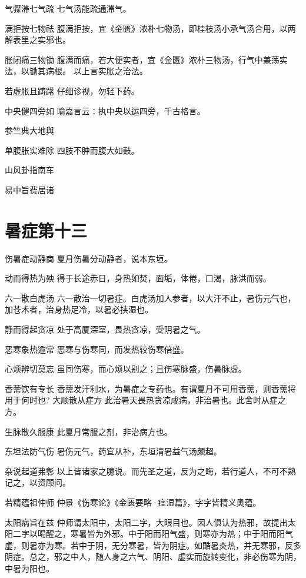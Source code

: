 \documentclass[a4paper,12pt,UTF8,twoside]{ctexbook}
\begin{document}
    气骤滞七气疏
    七气汤能疏通滞气。
    
    满拒按七物祛
    腹满拒按，宜《金匮》浓朴七物汤，即桂枝汤小承气汤合用，以两解表里之实邪也。
    
    胀闭痛三物锄
    腹满而痛，若大便实者，宜《金匮》浓朴三物汤，行气中兼荡实法，以锄其病根。
    以上言实胀之治法。
    
    若虚胀且踌躇
    仔细诊视，勿轻下药。
    
    中央健四旁如
    喻嘉言云∶执中央以运四旁，千古格言。
    
    参竺典大地舆
    
    单腹胀实难除
    四肢不肿而腹大如鼓。
    
    山风卦指南车
    
    易中旨费居诸
    
    \section{暑症第十三}
    
    伤暑症动静商
    夏月伤暑分动静者，说本东垣。
    
    动而得热为殃
    得于长途赤日，身热如焚，面垢，体倦，口渴，脉洪而弱。
    
    六一散白虎汤
    六一散治一切暑症。白虎汤加人参者，以大汗不止，暑伤元气也，加苍术者，治身热足冷，以暑必挟湿也。
    
    静而得起贪凉
    处于高厦深室，畏热贪凉，受阴暑之气。
    
    恶寒象热逾常
    恶寒与伤寒同，而发热较伤寒倍盛。
    
    心烦辨切莫忘
    虽同伤寒，而心烦以别之；且伤寒脉盛，伤暑脉虚。
    
    香薷饮有专长
    香薷发汗利水，为暑症之专药也。有谓夏月不可用香薷，则香薷将用于何时也?
    大顺散从症方
    此治暑天畏热贪凉成病，非治暑也。此舍时从症之方。
    
    生脉散久服康
    此夏月常服之剂，非治病方也。
    
    东坦法防气伤
    暑伤元气，药宜从补，东垣清暑益气汤颇超。
    
    杂说起道弗彰
    以上皆诸家之臆说。而先圣之道，反为之晦，若行道人，不可不熟记之，以资顾问。
    
    若精蕴祖仲师
    仲景《伤寒论》《金匮要略·痉湿篇》，字字皆精义奥蕴。
    
    太阳病旨在兹
    仲师谓太阳中，太阳二字，大眼目也。因人俱认为热邪，故提出太阳二字以喝醒之，寒暑皆为外邪。中于阳而阳气盛，则寒亦为热；中于阳而阳气虚，则暑亦为寒。若中于阴，无分寒暑，皆为阴症。如酷暑炎热，并无寒邪，反多阴症。总之，邪之中人，随人身之六气、阴阳、虚实而旋转变化，非必伤寒为阴，中暑为阳也。
    
\end{document}

